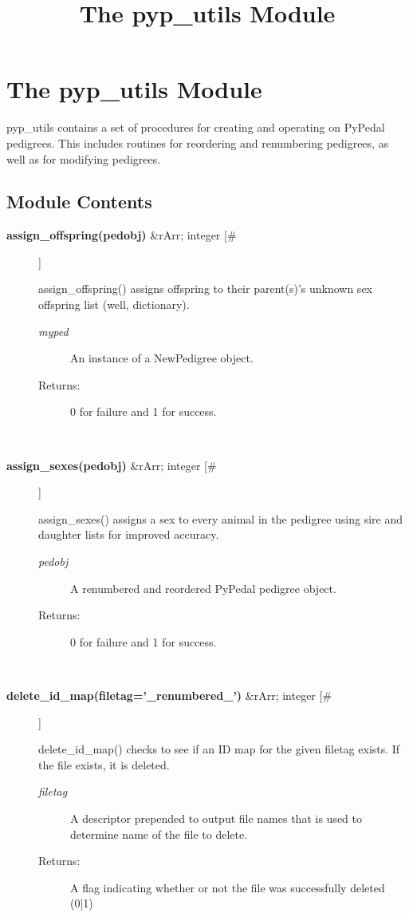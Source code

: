 \documentclass[10pt]{article}
\title{The pyp\_utils Module}
\begin{document}
\section*{The pyp\_utils Module}


 pyp\_utils contains a set of procedures for creating and operating on PyPedal pedigrees. This includes routines for reordering and renumbering pedigrees, as well as for modifying pedigrees.
\subsection*{Module Contents}
\begin{description}
\item[\textbf{assign\_offspring(pedobj)}
 \&rArr; integer [\#]]

 assign\_offspring() assigns offspring to their parent(s)'s unknown sex offspring list (well, dictionary).
\begin{description}
\item[\emph{myped}
] An instance of a NewPedigree object.
\item[Returns:] 0 for failure and 1 for success.

\end{description}
\\ 

\item[\textbf{assign\_sexes(pedobj)}
 \&rArr; integer [\#]]

 assign\_sexes() assigns a sex to every animal in the pedigree using sire and daughter lists for improved accuracy.
\begin{description}
\item[\emph{pedobj}
] A renumbered and reordered PyPedal pedigree object.
\item[Returns:] 0 for failure and 1 for success.

\end{description}
\\ 

\item[\textbf{delete\_id\_map(filetag='\_renumbered\_')}
 \&rArr; integer [\#]]

 delete\_id\_map() checks to see if an ID map for the given filetag exists. If the file exists, it is deleted.
\begin{description}
\item[\emph{filetag}
] A descriptor prepended to output file names that is used to determine name of the file to delete.
\item[Returns:] A flag indicating whether or not the file was successfully deleted (0|1)


\end{description}
\end{description}
\end{document}
